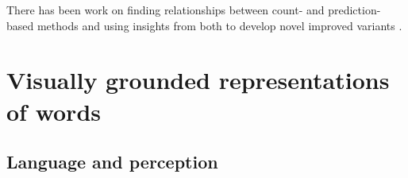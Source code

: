 


There has been work on finding relationships between
count- and prediction-based methods \citep{levy2014neural} and
using insights from both to develop novel improved
variants \citep{levy2015improving}.





\section{Visually grounded representations of words}
\label{sec:visualwords}

\subsection{Language and perception}
\label{sec:langperc}

